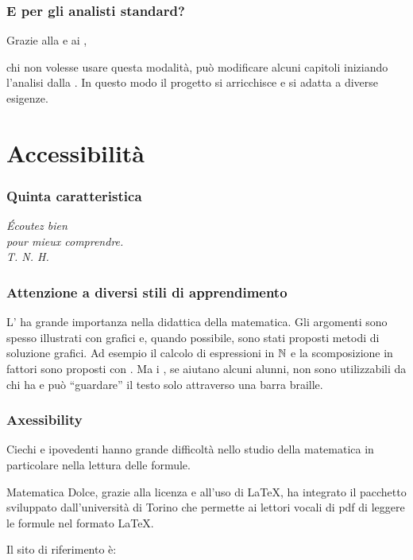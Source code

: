 \documentclass{beamer} %
\begin{document}
\begin{frame}\frametitle{E per gli analisti standard?}

Grazie alla  e ai ,

\pause
chi non volesse usare questa modalità, può modificare 
alcuni capitoli iniziando l'analisi dalla 
.
\spause
In questo modo il progetto si arricchisce e si adatta a diverse esigenze.
\end{frame}


\section{Accessibilità}


\begin{frame}\frametitle{Quinta caratteristica}

\begin{center}  \end{center}

\vspace{20mm}
\begin{flushright}
\emph{Écoutez bien\\
pour mieux comprendre.\\
T. N. H.}
\end{flushright}

\end{frame}



\begin{frame}\frametitle{Attenzione a diversi stili di apprendimento}

L' ha grande importanza nella didattica della 
matematica.
\spause
Gli argomenti sono spesso illustrati con grafici e, quando possibile, sono 
stati proposti metodi di soluzione grafici.
\spause
Ad esempio il calcolo di espressioni in \(\mathbb{N}\) e la scomposizione in 
fattori sono proposti con .
\spause
Ma i , se aiutano alcuni alunni, non sono 
utilizzabili da chi ha  e può ``guardare'' 
il testo solo attraverso una barra braille.

\end{frame}


\begin{frame}\frametitle{Axessibility}

Ciechi e ipovedenti hanno grande difficoltà nello studio della matematica 
in particolare nella lettura delle formule.

Matematica Dolce, grazie alla licenza e all'uso di \LaTeX, ha integrato il 
pacchetto  sviluppato dall'università di Torino 
che permette ai lettori vocali di pdf di leggere le formule nel formato 
\LaTeX.

\bigskip
Il sito di riferimento è:

\begin{center}
\end{center}

\end{frame}
\end{document}
